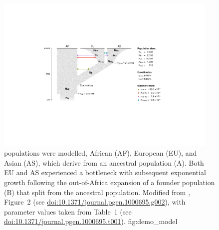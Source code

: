 

\begin{figure}[!htb]
\centering
\includegraphics[width=0.95\textwidth]{./img/ch3/demo_model}
{ populations were modelled, African (AF), European (EU), and Asian (AS), which derive from an ancestral population (A).
Both EU and AS experienced a bottleneck with subsequent exponential growth following the out-of-Africa expansion of a founder population (B) that split from the ancestral population.
Modified from \citet{Gutenkunst:2009gs}, Figure~2 (see \url{doi:10.1371/journal.pgen.1000695.g002}), with parameter values taken from Table~1 (see \url{doi:10.1371/journal.pgen.1000695.t001}).%
}%
{fig:demo_model}
\end{figure}
